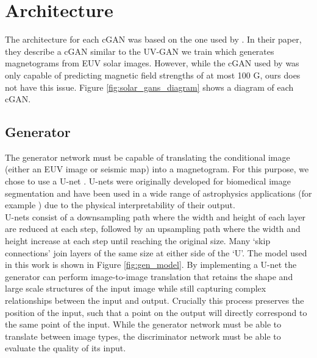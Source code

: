 \documentclass[11pt,a4paper,onecolumn]{report}
\begin{document}
%
%
%
%
%
\section{Architecture}
%
%
%
%
%
%

The architecture for each cGAN was based on the one used by \citet{Kim2019}. In
their paper, they describe a cGAN similar to the UV-GAN we train which generates
magnetograms from EUV solar images. However, while the cGAN used by
\citet{Kim2019} was only capable of predicting magnetic field strengths of at
most 100 G, ours does not have this issue.
Figure \ref{fig:solar_gans_diagram} shows a diagram of each cGAN.


\subsection{Generator}
The generator network must be capable of translating the conditional image
(either an EUV image or seismic map) into a magnetogram. For this purpose, we
chose to use a U-net \citep{ronneberger_u-net_2015}. U-nets were originally
developed for biomedical image segmentation and have been used in a wide range
of astrophysics applications (for example
\citet{felipe_improved_2019,bekki_quantifying_2021,baso_solar_2019}) due to the
physical interpretability of their output. \\

U-nets consist of a downsampling path where the width and height of each layer
are reduced at each step, followed by an upsampling path where the width and
height increase at each step until reaching the original size. Many `skip
connections' join layers of the same size at either side of the `U'. The model
used in this work is shown in Figure \ref{fig:gen_model}. By implementing a
U-net the generator can perform image-to-image translation that retains the
shape and large scale structures of the input image while still capturing
complex relationships between the input and output. Crucially this process
preserves the position of the input, such that a point on the output will
directly correspond to the same point of the input. While the generator network
must be able to translate between image types, the discriminator network must be
able to evaluate the quality of its input.
\end{document}

